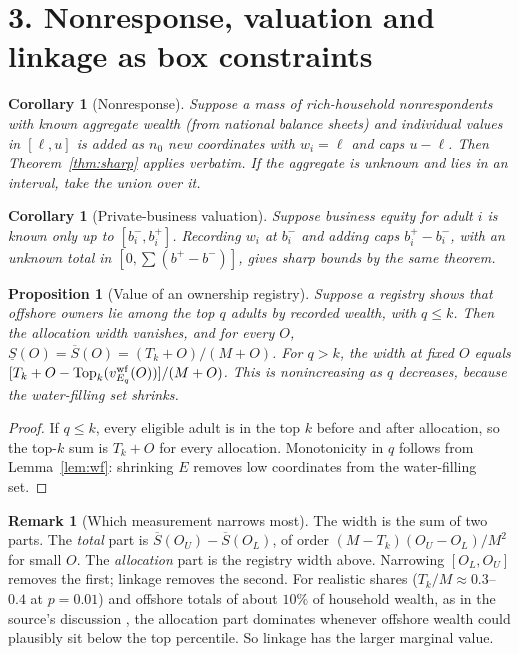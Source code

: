 \documentclass[11pt]{article}
\newtheorem{proposition}[theorem]{Proposition}
\newtheorem{corollary}[theorem]{Corollary}
\theoremstyle{definition}
\newtheorem{remark}[theorem]{Remark}
\begin{document}
\section*{3. Nonresponse, valuation and linkage as box constraints}
\begin{corollary}[Nonresponse]
Suppose a mass of rich-household nonrespondents with known aggregate wealth (from national balance sheets) and individual
values in $[\ell,u]$ is added as $n_0$ new coordinates with $w_i=\ell$ and caps $u-\ell$. Then Theorem~\ref{thm:sharp}
applies verbatim. If the aggregate is unknown and lies in an interval, take the union over it.
\end{corollary}
\begin{corollary}[Private-business valuation]
Suppose business equity for adult $i$ is known only up to $[b_i^-,b_i^+]$. Recording $w_i$ at $b_i^-$ and adding caps
$b_i^+-b_i^-$, with an unknown total in $[0,\sum(b^+-b^-)]$, gives sharp bounds by the same theorem.
\end{corollary}
\begin{proposition}[Value of an ownership registry]\label{prop:reg}
Suppose a registry shows that offshore owners lie among the top $q$ adults by recorded wealth, with $q\le k$. Then the
allocation width vanishes, and for every $O$, $\underline S(O)=\overline S(O)=(T_k+O)/(M+O)$. For $q>k$, the width at fixed
$O$ equals $[T_k+O-\mathrm{Top}_k(v^{\rm wf}_{E_q}(O))]/(M+O)$. This is nonincreasing as $q$ decreases, because the water-filling set shrinks.
\end{proposition}
\begin{proof}
If $q\le k$, every eligible adult is in the top $k$ before and after allocation, so the top-$k$ sum is $T_k+O$ for every
allocation. Monotonicity in $q$ follows from Lemma~\ref{lem:wf}: shrinking $E$ removes low coordinates from the water-filling
set.
\end{proof}
\begin{remark}[Which measurement narrows most]
The width is the sum of two parts. The \emph{total} part is $\overline S(O_U)-\overline S(O_L)$, of order
$(M-T_k)(O_U-O_L)/M^2$ for small $O$. The \emph{allocation} part is the registry width above. Narrowing $[O_L,O_U]$ removes
the first; linkage removes the second. For realistic shares ($T_k/M\approx0.3$--$0.4$ at $p=0.01$) and offshore totals of
about $10\%$ of household wealth, as in the source's discussion \cite{zucman}, the allocation part dominates whenever
offshore wealth could plausibly sit below the top percentile. So linkage has the larger marginal value.
\end{remark}
\end{document}
